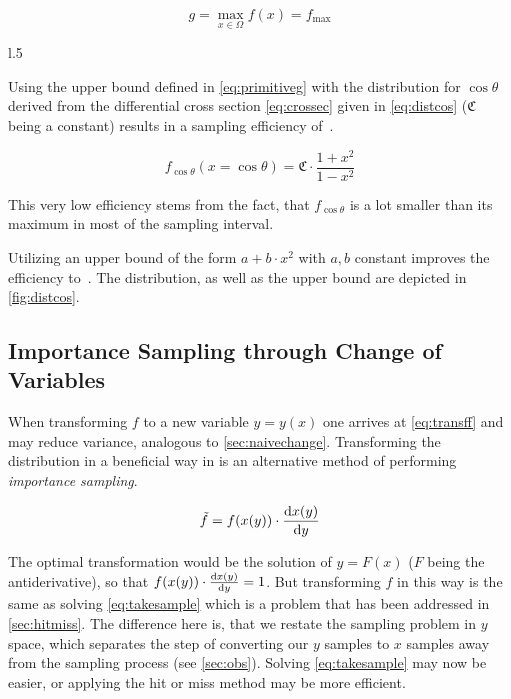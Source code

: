 \begin{equation}
  \label{eq:primitiveg}
  g=\max_{x\in\Omega}f(x)=f_{\text{max}}
\end{equation}

\begin{wrapfigure}[15]{l}{.5\textwidth}
  \caption{\label{fig:distcos} The distribution \cref{eq:distcos} and an upper bound of
    the form \(a + b\cdot x^2\).}
\end{wrapfigure}

Using the upper bound defined in \cref{eq:primitiveg} with the
distribution for \(\cos\theta\) derived from the differential cross
section \cref{eq:crossec} given in \cref{eq:distcos}
(\(\mathfrak{C}\) being a constant) results in a sampling efficiency
of~.

\begin{equation}
  \label{eq:distcos}
  f_{\cos\theta}(x=\cos\theta) = \mathfrak{C}\cdot\frac{1+x^2}{1-x^2}
\end{equation}

This very low efficiency stems from the fact, that \(f_{\cos\theta}\)
is a lot smaller than its maximum in most of the sampling interval.

Utilizing an upper bound of the form \(a + b\cdot x^2\) with \(a, b\)
constant improves the efficiency
to~. The distribution, as well as the
upper bound are depicted in \cref{fig:distcos}.

\subsection{Importance Sampling through Change of Variables}%
\label{sec:importsamp}

When transforming \(f\) to a new variable \(y=y(x)\) one arrives at
\cref{eq:transff} and may reduce variance, analogous to
\cref{sec:naivechange}. Transforming the distribution in a beneficial
way in is an alternative method of performing \emph{importance
  sampling}.

\begin{equation}
  \label{eq:transff}
  \tilde{f} = f(x(y)) \cdot \dv{x(y)}{y}
\end{equation}

The optimal transformation would be the solution of \(y = F(x)\)
(\(F\) being the antiderivative), so that
\(f(x(y)) \cdot \dv{x(y)}{y} = 1\). But transforming \(f\) in this way
is the same as solving \cref{eq:takesample} which is a problem that
has been addressed in \cref{sec:hitmiss}. The difference here is, that
we restate the sampling problem in \(y\) space, which separates the
step of converting our \(y\) samples to \(x\) samples away from the
sampling process (see \cref{sec:obs}). Solving \cref{eq:takesample}
may now be easier, or applying the hit or miss method may be more
efficient.

